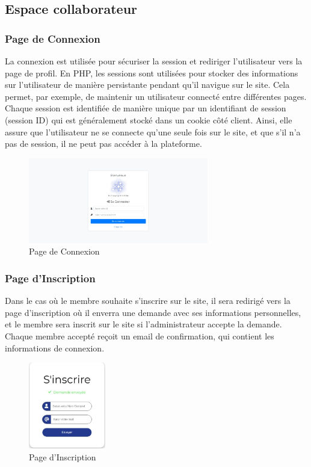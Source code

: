\documentclass{article}
\begin{document}
        \subsection{Espace collaborateur}
            \subsubsection{Page de Connexion}
                La connexion est utilisée pour sécuriser la session et rediriger l'utilisateur vers la page de profil. En PHP, les sessions sont utilisées pour stocker des informations sur l'utilisateur de manière persistante pendant qu'il navigue sur le site. Cela permet, par exemple, de maintenir un utilisateur connecté entre différentes pages. Chaque session est identifiée de manière unique par un identifiant de session (session ID) qui est généralement stocké dans un cookie côté client.
                Ainsi, elle assure que l'utilisateur ne se connecte qu'une seule fois sur le site, et que s'il n'a pas de session, il ne peut pas accéder à la plateforme.
                \begin{figure}[h!]
                    \centering
                    \includegraphics[width=0.7\textwidth]{assets/webSite/loginCollab.jpeg}
                    \caption{Page de Connexion}
                \end{figure}
                \FloatBarrier
            \subsubsection{Page d'Inscription}
                Dans le cas où le membre souhaite s'inscrire sur le site, il sera redirigé vers la page d'inscription où il enverra une demande avec ses informations personnelles, et le membre sera inscrit sur le site si l'administrateur accepte la demande.
                Chaque membre accepté reçoit un email de confirmation, qui contient les informations de connexion.
                \begin{figure}[h!]
                    \centering
                    \includegraphics[width=0.3\textwidth]{assets/webSite/envoieDemande.jpeg}
                    \caption{Page d'Inscription}
                \end{figure}
                \FloatBarrier
\end{document}
